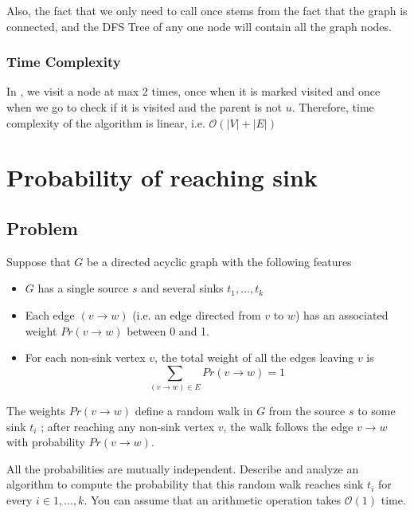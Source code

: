 \documentclass[12pt]{article}
\newenvironment{statement}{\color[rgb]{1.00,0.00,0.50} {}}{}
\begin{document}
Also, the fact that we only need to call \args{} once stems from the fact that the graph is connected, and the DFS Tree of any one node will contain all the graph nodes.

\subsubsection{Time Complexity}


In , we visit a node at max 2 times, once when it is marked visited and once when we go to check if it is visited and the parent is not $u$. Therefore, time complexity of the algorithm is linear, i.e. $\mathcal{O}(|V| + |E|)$


\pagebreak

\section{Probability of reaching sink}

\subsection{Problem}

\begin{statement}
    Suppose that $G$ be a directed acyclic graph with the following features
    \begin{itemize}
        \item $G$ has a single source $s$ and several sinks $t_1, \dots , t_k$
        \item Each edge $(v \rightarrow w)$ (i.e. an edge directed from $v$ to $w$) has an associated weight $Pr(v \rightarrow w)$ between 0 and 1.
        \item For each non-sink vertex $v$, the total weight of all the edges leaving $v$ is $$\sum_{(v \rightarrow w) \in E} Pr(v \rightarrow w) = 1$$
    \end{itemize}

The weights $Pr(v \rightarrow w)$ define a random walk in $G$ from the source $s$ to some sink $t_i$
; after reaching any non-sink vertex $v$, the walk follows the edge $v \rightarrow w$ with probability $Pr(v \rightarrow w)$.

All the probabilities are mutually independent. Describe and analyze an algorithm to compute the
probability that this random walk reaches sink $t_i$
for every $i \in {1, \dots , k}$. You can assume that an
arithmetic operation takes $\mathcal{O}(1)$ time.
\end{statement}
\end{document}
